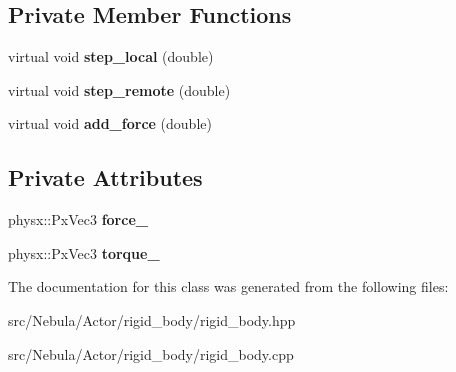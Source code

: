 \subsection*{\-Private \-Member \-Functions}
\begin{DoxyCompactItemize}
\item 
\hypertarget{classNeb_1_1Actor_1_1RigidBody_1_1RigidBody_ab36f02f9a8c9beed9436030677f468df}{virtual void {\bfseries step\-\_\-local} (double)}\label{classNeb_1_1Actor_1_1RigidBody_1_1RigidBody_ab36f02f9a8c9beed9436030677f468df}

\item 
\hypertarget{classNeb_1_1Actor_1_1RigidBody_1_1RigidBody_a905367c35a10c7b01096292ad3181c65}{virtual void {\bfseries step\-\_\-remote} (double)}\label{classNeb_1_1Actor_1_1RigidBody_1_1RigidBody_a905367c35a10c7b01096292ad3181c65}

\item 
\hypertarget{classNeb_1_1Actor_1_1RigidBody_1_1RigidBody_a1915e34c3747c80bd6355bddec02eaf3}{virtual void {\bfseries add\-\_\-force} (double)}\label{classNeb_1_1Actor_1_1RigidBody_1_1RigidBody_a1915e34c3747c80bd6355bddec02eaf3}

\end{DoxyCompactItemize}
\subsection*{\-Private \-Attributes}
\begin{DoxyCompactItemize}
\item 
\hypertarget{classNeb_1_1Actor_1_1RigidBody_1_1RigidBody_a28bf823fd850c30e93ae26460db03f82}{physx\-::\-Px\-Vec3 {\bfseries force\-\_\-}}\label{classNeb_1_1Actor_1_1RigidBody_1_1RigidBody_a28bf823fd850c30e93ae26460db03f82}

\item 
\hypertarget{classNeb_1_1Actor_1_1RigidBody_1_1RigidBody_a8f8353b311e864795bb384a950c3b2d1}{physx\-::\-Px\-Vec3 {\bfseries torque\-\_\-}}\label{classNeb_1_1Actor_1_1RigidBody_1_1RigidBody_a8f8353b311e864795bb384a950c3b2d1}

\end{DoxyCompactItemize}


\-The documentation for this class was generated from the following files\-:\begin{DoxyCompactItemize}
\item 
src/\-Nebula/\-Actor/rigid\-\_\-body/rigid\-\_\-body.\-hpp\item 
src/\-Nebula/\-Actor/rigid\-\_\-body/rigid\-\_\-body.\-cpp\end{DoxyCompactItemize}
